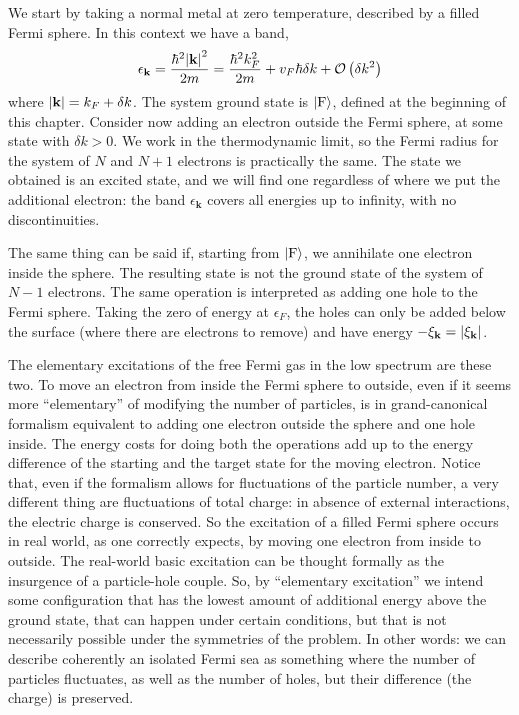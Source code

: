 We start by taking a normal metal at zero temperature, described by a filled Fermi sphere. In this context we have a band,
\[
	\epsilon_\mathbf{k} = \frac{\hbar^2 \abs{\mathbf{k}}^2}{2m} = \frac{\hbar^2 k_F^2}{2m} + v_F \hbar\delta k + \mathcal{O}\left({\delta k^2}\right)
\]
where $\abs{\mathbf{k}} = k_F + \delta k$. The system ground state is $\ket{\mathrm{F}}$, defined at the beginning of this chapter. Consider now adding an electron outside the Fermi sphere, at some state with $\delta k > 0$. We work in the thermodynamic limit, so the Fermi radius for the system of $N$ and $N+1$ electrons is practically the same. The state we obtained is an excited state, and we will find one regardless of where we put the additional electron: the band $\epsilon_\mathbf{k}$ covers all energies up to infinity, with no discontinuities.

The same thing can be said if, starting from $\ket{\mathrm{F}}$, we annihilate one electron inside the sphere. The resulting state is not the ground state of the system of $N-1$ electrons. The same operation is interpreted as adding one hole to the Fermi sphere. Taking the zero of energy at $\epsilon_F$, the holes can only be added below the surface (where there are electrons to remove) and have energy $-\xi_\mathbf{k} = \abs{\xi_\mathbf{k}}$.

The elementary excitations of the free Fermi gas in the low spectrum are these two. To move an electron from inside the Fermi sphere to outside, even if it seems more ``elementary'' of modifying the number of particles, is in grand-canonical formalism equivalent to adding one electron outside the sphere and one hole inside. The energy costs for doing both the operations add up to the energy difference of the starting and the target state for the moving electron. Notice that, even if the formalism allows for fluctuations of the particle number, a very different thing are fluctuations of total charge: in absence of external interactions, the electric charge is conserved. So the excitation of a filled Fermi sphere occurs in real world, as one correctly expects, by moving one electron from inside to outside. The real-world basic excitation can be thought formally as the insurgence of a particle-hole couple. So, by ``elementary excitation'' we intend some configuration that has the lowest amount of additional energy above the ground state, that can happen under certain conditions, but that is not necessarily possible under the symmetries of the problem. In other words: we can describe coherently an isolated Fermi sea as something where the number of particles fluctuates, as well as the number of holes, but their difference (the charge) is preserved.

